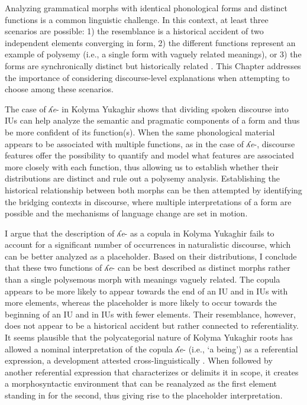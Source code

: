 \documentclass[output=paper,colorlinks,citecolor=brown
\ChapterDOI{10.5281/zenodo.15697581}
]{langscibook}
\begin{document}
Analyzing grammatical morphs with identical phonological forms and distinct functions is a common linguistic challenge. 
In this context, at least three scenarios are possible: 1) the resemblance is a historical accident of two independent elements converging in form, 2) the different functions represent an example of polysemy (i.e., a single form with vaguely related meanings), or 3) the forms are synchronically distinct but historically related \citep{Epps2008a}.
This Chapter addresses the importance of considering discourse-level explanations when attempting to choose among these scenarios. 

The case of \textit{ʎe}- in Kolyma Yukaghir shows that dividing spoken discourse into IUs can help analyze the semantic and pragmatic components of a form and thus be more confident of its function(s).
When the same phonological material appears to be associated with multiple functions, as in the case of \textit{ʎe}-, discourse features offer the possibility to quantify and model what features are associated more closely with each function, thus allowing us to establish whether their distributions are distinct and rule out a polysemy analysis. 
Establishing the historical relationship between both morphs can be then attempted by identifying the bridging contexts in discourse, where multiple interpretations of a form are possible and the mechanisms of language change are set in motion.

I argue that the description of \textit{ʎe}- as a copula in Kolyma Yukaghir fails to account for a significant number of occurrences in naturalistic discourse, which can be better analyzed as a placeholder. 
Based on their distributions, I conclude that these two functions of \textit{ʎe}- can be best described as distinct morphs rather than a single polysemous morph with meanings vaguely related.
The copula appears to be more likely to appear towards the end of an IU and in IUs with more elements, whereas the placeholder is more likely to occur towards the beginning of an IU and in IUs with fewer elements.
Their resemblance, however, does not appear to be a historical accident but rather connected to referentiality. 
It seems plausible that the polycategorial nature of Kolyma Yukaghir roots has allowed a nominal interpretation of the copula \textit{ʎe}- (i.e., `a being') as a referential expression, a development attested cross-linguistically \citep{Katz1996}.
When followed by another referential expression that characterizes or delimits it in scope, it creates a morphosyntactic environment that can be reanalyzed as the first element standing in for the second, thus giving rise to the placeholder interpretation. 
\end{document}
